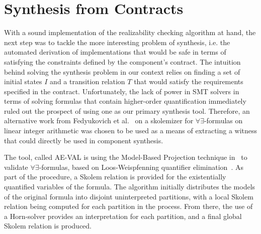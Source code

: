 \section{Synthesis from Contracts}
\label{sec:synthesis}

With a sound implementation of the realizability checking algorithm at
hand, the next step was to tackle the more
interesting problem of synthesis, i.e. the automated derivation of
implementations that would be safe in terms of satisfying the constraints
defined by the component's contract. The intuition behind solving the
synthesis problem in our context relies on finding a set of initial states
$I$ and a transition relation $T$ that would satisfy the requirements
specified in the contract. Unfortunately, the lack of power in SMT solvers in
terms of solving formulas that contain higher-order quantification immediately
ruled out the prospect of using one as our primary synthesis tool. Therefore, an alternative work from Fedyukovich et al.~\cite{fedyukovichae,fedyukovich2014automated} on a skolemizer for $\forall\exists$-formulas on linear integer arithmetic was chosen to be used as a means of extracting a witness that could directly be used in component synthesis.

The tool, called AE-VAL is using the Model-Based Projection technique
in~\cite{komuravelli2014smt} to validate $\forall\exists$-formulas, based on
Loos-Weispfenning quantifier elimination~\cite{loos1993applying}.
As part of the procedure, a Skolem relation is provided for the existentially quantified variables of the formula. The algorithm
initially distributes the models of the original formula into disjoint
uninterpreted partitions, with a local Skolem relation being computed for each
partition in the process. From there, the use of a Horn-solver provides an
interpretation for each partition, and a final global Skolem relation is produced.

